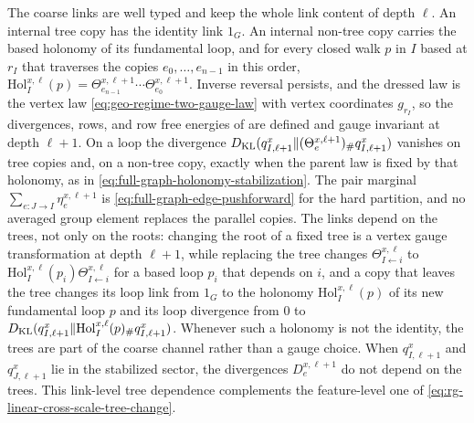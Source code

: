 The coarse links are well typed and keep the whole link content of depth $\ell$. An
internal tree copy has the identity link $1_G$. An internal non-tree copy carries the
based holonomy of its fundamental loop, and for every closed walk $p$ in $I$ based at
$r_I$ that traverses the copies $e_0,\ldots,e_{n-1}$ in this order,
$\mathrm{Hol}^{x,\ell}_I(p)=\Theta^{x,\ell+1}_{e_{n-1}}\cdots\Theta^{x,\ell+1}_{e_0}$.
Inverse reversal persists, and the dressed law is the vertex law
\eqref{eq:geo-regime-two-gauge-law} with vertex coordinates $g_{r_I}$, so the
divergences, rows, and row free energies of
 are defined and gauge invariant at
depth $\ell+1$. On a loop the divergence
$D_{\mathrm{KL}}(q^x_{I,\ell+1}\Vert(\Theta^{x,\ell+1}_e)_\#q^x_{I,\ell+1})$ vanishes on tree copies
and, on a non-tree copy, exactly when the parent law is fixed by that holonomy, as in
\eqref{eq:full-graph-holonomy-stabilization}. The pair marginal
$\sum_{e:J\to I}\eta^{x,\ell+1}_e$ is \eqref{eq:full-graph-edge-pushforward} for the
hard partition, and no averaged group element replaces the parallel copies. The links
depend on the trees, not only on the roots: changing the root of a fixed tree is a
vertex gauge transformation at depth $\ell+1$, while replacing the tree changes
$\Theta^{x,\ell}_{I\leftarrow i}$ to $\mathrm{Hol}^{x,\ell}_I(p_i)\Theta^{x,\ell}_{I\leftarrow i}$
for a based loop $p_i$ that depends on $i$, and a copy that leaves the tree changes its
loop link from $1_G$ to the holonomy $\mathrm{Hol}^{x,\ell}_I(p)$ of its new fundamental
loop $p$ and its loop divergence from $0$ to
$D_{\mathrm{KL}}(q^x_{I,\ell+1}\Vert\mathrm{Hol}^{x,\ell}_I(p)_\#q^x_{I,\ell+1})$. Whenever such a
holonomy is not the identity, the trees are part of the coarse channel rather than a
gauge choice. When $q^x_{I,\ell+1}$ and $q^x_{J,\ell+1}$ lie in the stabilized sector,
the divergences $D^{x,\ell+1}_e$ do not depend on the trees. This link-level tree
dependence complements the feature-level one of
\eqref{eq:rg-linear-cross-scale-tree-change}. 

